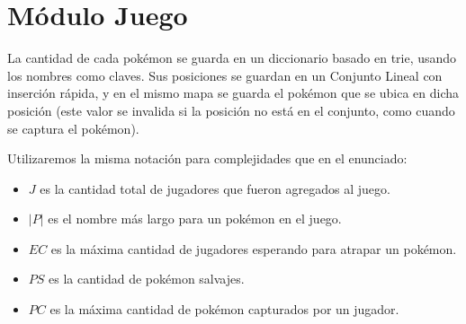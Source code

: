 \section{Módulo Juego}

La cantidad de cada pokémon se guarda en un diccionario basado en trie, usando los nombres como claves. Sus posiciones se guardan en un Conjunto Lineal con inserción rápida, y en el mismo mapa se guarda el pokémon que se ubica en dicha posición (este valor se invalida si la posición no está en el conjunto, como cuando se captura el pokémon).

Utilizaremos la misma notación para complejidades que en el enunciado:

\begin{itemize}
	\item $J$ es la cantidad total de jugadores que fueron agregados al juego.

	\item $|P|$ es el nombre más largo para un pokémon en el juego.

	\item $EC$ es la máxima cantidad de jugadores esperando para atrapar un pokémon.

	\item $PS$ es la cantidad de pokémon salvajes.

	\item $PC$ es la máxima cantidad de pokémon capturados por un jugador.
\end{itemize}

